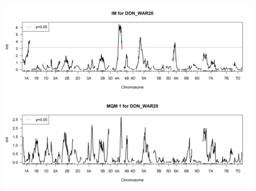 \documentclass[
]{article}
\begin{document}
\includegraphics{Scan_IM_DON_WAR20.jpg}
\includegraphics{Scan_MQM1_DON_WAR20.jpg} \pagebreak
\end{document}
